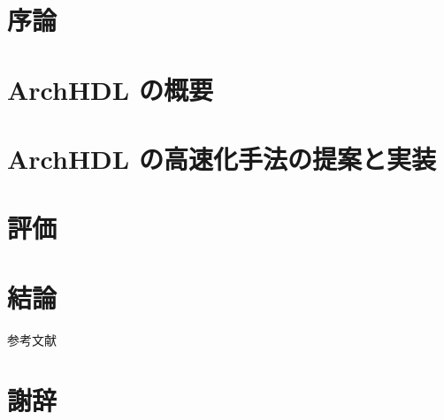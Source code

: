 \begin{abstract}
 
\end{abstract}

\maketitle

\section{序論}



\section{ArchHDL の概要} \label{s:summary}



\section{ArchHDL の高速化手法の提案と実装} \label{s:method}



\section{評価} \label{s:evaluation}



\section{結論} \label{s:conclusion}



 参考文献 \fi


\section{謝辞} \label{s:acknowledgment}


